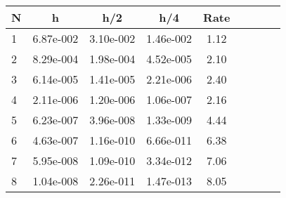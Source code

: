 \begin{tabular}{lcccccccc}
N & h & h/2 & h/4 & Rate\\
\hline
1& 6.87e-002& 3.10e-002& 1.46e-002& 1.12\\
2& 8.29e-004& 1.98e-004& 4.52e-005& 2.10\\
3& 6.14e-005& 1.41e-005& 2.21e-006& 2.40\\
4& 2.11e-006& 1.20e-006& 1.06e-007& 2.16\\
5& 6.23e-007& 3.96e-008& 1.33e-009& 4.44\\
6& 4.63e-007& 1.16e-010& 6.66e-011& 6.38\\
7& 5.95e-008& 1.09e-010& 3.34e-012& 7.06\\
8& 1.04e-008& 2.26e-011& 1.47e-013& 8.05\\
\hline
\end{tabular}

